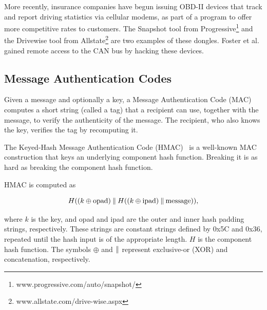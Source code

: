 More recently, insurance companies have begun issuing OBD-II devices 
that track and report driving statistics via cellular modems,
as part of a program to offer more competitive rates to customers. 
The Snapshot tool from Progressive\footnote{www.progressive.com/auto/snapshot/} 
and the Drivewise tool from Allstate\footnote{www.allstate.com/drive-wise.aspx} 
are two examples of these dongles. Foster et al.~\cite{Foster15} 
gained remote access to the CAN bus by hacking these devices.

\subsection{Message Authentication Codes}

Given a message and optionally a key, a Message Authentication Code (MAC) computes a short string (called a tag) 
that a recipient can use, together with the message, to verify the authenticity of the message.  
The recipient, who also knows the key, 
verifies the tag by recomputing it.

The Keyed-Hash Message Authentication Code (HMAC)~\cite{HMAC,FIPS-198-1,rfc2104,nist107} 
is a well-known MAC construction that keys an underlying component hash function.  
Breaking it is as hard as breaking the component hash function.

HMAC is computed as

\begin{equation}
H((k\oplus \text{opad})\mathbin{\|} H((k\oplus \text{ipad})\mathbin{\|} \text{message})) ,
\end{equation}

\noindent
where $k$ is the key, and opad and ipad are the outer and inner hash padding strings, respectively. 
These strings are constant strings defined by 0x5C and 0x36, repeated until the hash input is of the appropriate length. 
$H$ is the component hash function. 
The symbols $\oplus$ and $\mathbin{\|}$ represent exclusive-or (XOR) and concatenation, respectively.





